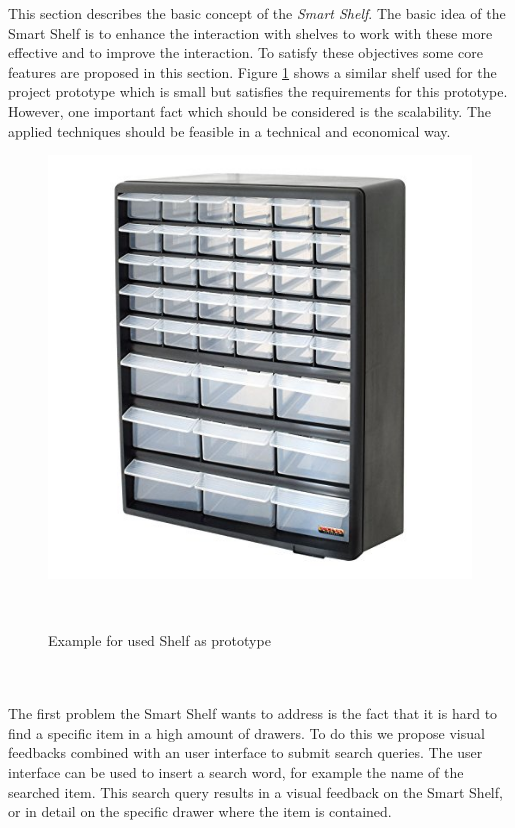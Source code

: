 This section describes the basic concept of the \textit{Smart Shelf}. 
The basic idea of the Smart Shelf is to enhance the interaction with shelves to work with these more effective and to improve the interaction. 
To satisfy these objectives some core features are proposed in this section. 
Figure \ref{fig:example_shelf} shows a similar shelf used for the project prototype which is small but satisfies the requirements for this prototype. 
However, one important fact which should be considered is the scalability. 
The applied techniques should be feasible in a technical and economical way. 
%
\begin{figure}
	\includegraphics[width=0.9\columnwidth]{figures/example-prototype-shelf}
	\caption{Example for used Shelf as prototype}~\label{fig:example_shelf}
\end{figure}
%
\\
\\
The first problem the Smart Shelf wants to address is the fact that it is hard to find a specific item in a high amount of drawers. 
To do this we propose visual feedbacks combined with an user interface to submit search queries. 
The user interface can be used to insert a search word, for example the name of the searched item. 
This search query results in a visual feedback on the Smart Shelf, or in detail on the specific drawer where the item is contained. 

